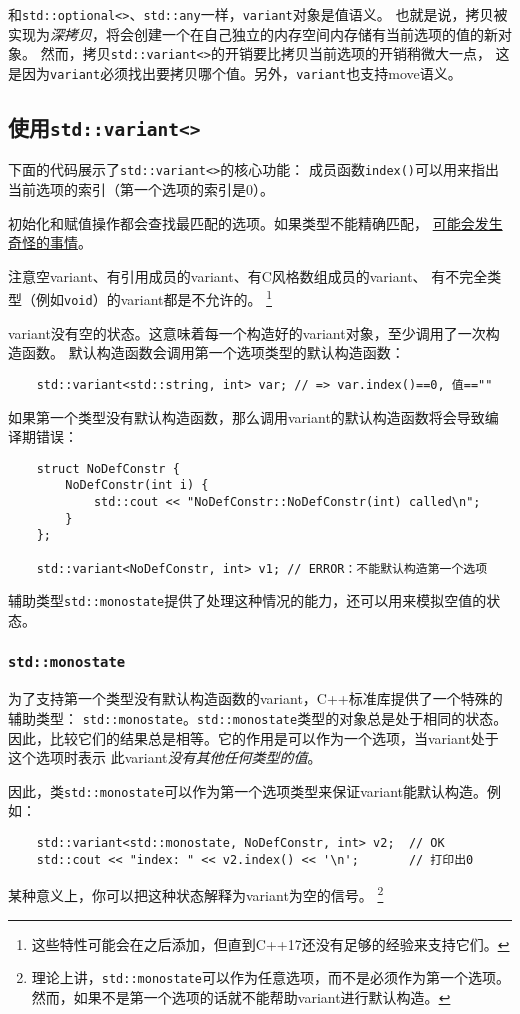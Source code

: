 和\texttt{std::optional<>}、\texttt{std::any}一样，\texttt{variant}对象是值语义。
也就是说，拷贝被实现为\emph{深拷贝}，将会创建一个在自己独立的内存空间内存储有当前选项的值的新对象。
然而，拷贝\texttt{std::variant<>}的开销要比拷贝当前选项的开销稍微大一点，
这是因为\texttt{variant}必须找出要拷贝哪个值。另外，\texttt{variant}也支持move语义。

\subsection{使用\texttt{std::variant<>}}
下面的代码展示了\texttt{std::variant<>}的核心功能：
成员函数\texttt{index()}可以用来指出当前选项的索引（第一个选项的索引是0）。

初始化和赋值操作都会查找最匹配的选项。如果类型不能精确匹配，
\hyperref[ch16.5]{可能会发生奇怪的事情}。

注意空variant、有引用成员的variant、有C风格数组成员的variant、
有不完全类型（例如\texttt{void}）的variant都是不允许的。
\footnote{这些特性可能会在之后添加，但直到C++17还没有足够的经验来支持它们。}

variant没有空的状态。这意味着每一个构造好的variant对象，至少调用了一次构造函数。
默认构造函数会调用第一个选项类型的默认构造函数：
\begin{lstlisting}
    std::variant<std::string, int> var; // => var.index()==0, 值==""
\end{lstlisting}
如果第一个类型没有默认构造函数，那么调用variant的默认构造函数将会导致编译期错误：
\begin{lstlisting}
    struct NoDefConstr {
        NoDefConstr(int i) {
            std::cout << "NoDefConstr::NoDefConstr(int) called\n";
        }
    };

    std::variant<NoDefConstr, int> v1; // ERROR：不能默认构造第一个选项
\end{lstlisting}
辅助类型\texttt{std::monostate}提供了处理这种情况的能力，还可以用来模拟空值的状态。

\subsubsection*{\texttt{std::monostate}}\label{ch16.2.1}
为了支持第一个类型没有默认构造函数的variant，C++标准库提供了一个特殊的辅助类型：
\texttt{std::monostate}。\texttt{std::monostate}类型的对象总是处于相同的状态。
因此，比较它们的结果总是相等。它的作用是可以作为一个选项，当variant处于这个选项时表示
此variant\emph{没有其他任何类型的值}。

因此，类\texttt{std::monostate}可以作为第一个选项类型来保证variant能默认构造。例如：
\begin{lstlisting}
    std::variant<std::monostate, NoDefConstr, int> v2;  // OK
    std::cout << "index: " << v2.index() << '\n';       // 打印出0
\end{lstlisting}
某种意义上，你可以把这种状态解释为variant为空的信号。
\footnote{理论上讲，\texttt{std::monostate}可以作为任意选项，而不是必须作为第一个选项。
然而，如果不是第一个选项的话就不能帮助variant进行默认构造。}

